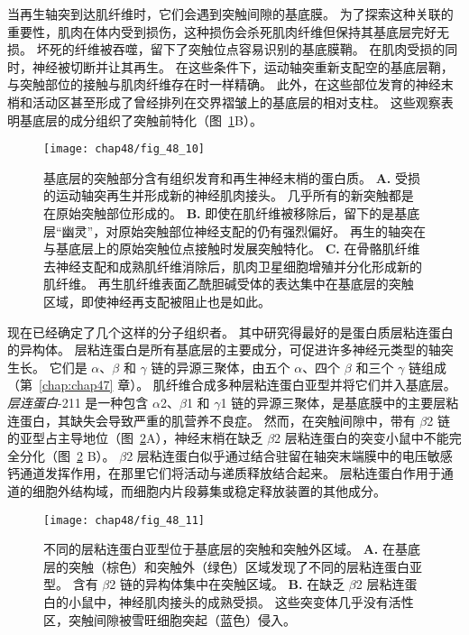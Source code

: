 当再生轴突到达肌纤维时，它们会遇到突触间隙的基底膜。
为了探索这种关联的重要性，肌肉在体内受到损伤，这种损伤会杀死肌肉纤维但保持其基底层完好无损。
坏死的纤维被吞噬，留下了突触位点容易识别的基底膜鞘。
在肌肉受损的同时，神经被切断并让其再生。
在这些条件下，运动轴突重新支配空的基底层鞘，与突触部位的接触与肌肉纤维存在时一样精确。
此外，在这些部位发育的神经末梢和活动区甚至形成了曾经排列在交界褶皱上的基底层的相对支柱。
这些观察表明基底层的成分组织了突触前特化（图~\ref{fig:48_10}B）。


\begin{figure}[htbp]
	\centering
	\texttt{[image: chap48/fig\_48\_10]}
	\caption{基底层的突触部分含有组织发育和再生神经末梢的蛋白质。
		\textbf{A.} 受损的运动轴突再生并形成新的神经肌肉接头。
		几乎所有的新突触都是在原始突触部位形成的\cite{glicksman1983differentiation}。
		\textbf{B.} 即使在肌纤维被移除后，留下的是基底层“幽灵”，对原始突触部位神经支配的仍有强烈偏好。 
		再生的轴突在与基底层上的原始突触位点接触时发展突触特化\cite{glicksman1983differentiation}。
		\textbf{C.} 在骨骼肌纤维去神经支配和成熟肌纤维消除后，肌肉卫星细胞增殖并分化形成新的肌纤维。
		再生肌纤维表面乙酰胆碱受体的表达集中在基底层的突触区域，即使神经再支配被阻止也是如此\cite{burden1979acetylcholine}。}
	\label{fig:48_10}
\end{figure}


现在已经确定了几个这样的分子组织者。
其中研究得最好的是蛋白质层粘连蛋白的异构体。
层粘连蛋白是所有基底层的主要成分，可促进许多神经元类型的轴突生长。
它们是 $ \alpha $、$ \beta $ 和 $ \gamma $ 链的异源三聚体，由五个 $ \alpha $、四个 $ \beta $ 和三个 $ \gamma $ 链组成（第~\ref{chap:chap47} 章）。
肌纤维合成多种层粘连蛋白亚型并将它们并入基底层。
\textit{层连蛋白}-211 是一种包含 $ \alpha $2、$ \beta $1 和 $ \gamma $1 链的异源三聚体，是基底膜中的主要层粘连蛋白，其缺失会导致严重的肌营养不良症。
然而，在突触间隙中，带有 $ \beta $2 链的亚型占主导地位（图~\ref{fig:48_11}A），神经末梢在缺乏 $ \beta $2 层粘连蛋白的突变小鼠中不能完全分化（图~\ref{fig:48_11} B）。 
$ \beta $2 层粘连蛋白似乎通过结合驻留在轴突末端膜中的电压敏感钙通道发挥作用，在那里它们将活动与递质释放结合起来。
层粘连蛋白作用于通道的细胞外结构域，而细胞内片段募集或稳定释放装置的其他成分。


\begin{figure}[htbp]
	\centering
	\texttt{[image: chap48/fig\_48\_11]}
	\caption{不同的层粘连蛋白亚型位于基底层的突触和突触外区域。
		\textbf{A.} 在基底层的突触（棕色）和突触外（绿色）区域发现了不同的层粘连蛋白亚型。
		含有 $\beta$2 链的异构体集中在突触区域。 
		\textbf{B.} 在缺乏 $\beta$2 层粘连蛋白的小鼠中，神经肌肉接头的成熟受损。
		这些突变体几乎没有活性区，突触间隙被雪旺细胞突起（蓝色）侵入\cite{noakes1995aberrant}。}
	\label{fig:48_11}
\end{figure}


